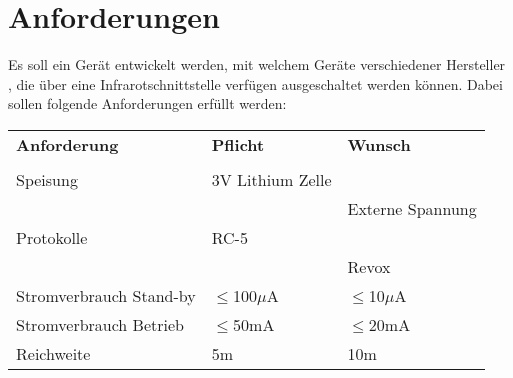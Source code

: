 



\section{Anforderungen}
Es soll ein Gerät entwickelt werden, mit welchem Geräte verschiedener 
Hersteller , die über eine Infrarotschnittstelle verfügen ausgeschaltet 
werden können. Dabei sollen folgende Anforderungen erfüllt werden: 

\begin{table}[h!]
  \begin{tabular}{@{}p{}p{}p{}}
    \rowcolor{white} \textbf{Anforderung}     & \textbf{Pflicht} & \textbf{Wunsch}\\
                                              &                  &                \\
    \rowcolor{white} Speisung                 & 3V Lithium Zelle &                \\
    \rowcolor{white}                          &                  & Externe Spannung\\
    \rowcolor{lgray} Protokolle               & RC-5             &                \\
    \rowcolor{lgray}                          &                  & Revox          \\
    \rowcolor{white} Stromverbrauch Stand-by  & $\leq$100$\mu$A  & $\leq$10$\mu$A \\
    \rowcolor{lgray} Stromverbrauch Betrieb   & $\leq$50mA       & $\leq$20mA     \\
    \rowcolor{white} Reichweite               & 5m               & 10m            \\
  \end{tabular}
  \label{tab:anforderungen}
\end{table}
